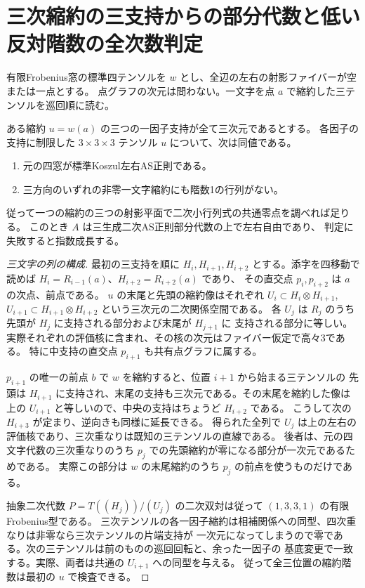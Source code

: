 \section{三次縮約の三支持からの部分代数と低い反対階数の全次数判定}
\label{sec:ternary-point-subalgebras}
有限Frobenius窓の標準四テンソルを $w$ とし、全辺の左右の射影ファイバーが空または一点とする。
点グラフの次元は問わない。一文字を点 $a$ で縮約した三テンソルを巡回順に読む。
\begin{theorem}\label{thm:ternary-point-subalgebras}
ある縮約 $u=w(a)$ の三つの一因子支持が全て三次元であるとする。
各因子の支持に制限した $3\times3\times3$ テンソル $u$ について、次は同値である。
\begin{enumerate}
\item 元の四窓が標準Koszul左右AS正則である。
\item 三方向のいずれの非零一文字縮約にも階数1の行列がない。
\end{enumerate}
従って一つの縮約の三つの射影平面で二次小行列式の共通零点を調べれば足りる。
このとき $A$ は三生成二次AS正則部分代数の上で左右自由であり、
判定に失敗すると指数成長する。
\end{theorem}
\begin{proof}[三文字の列の構成]
最初の三支持を順に $H_i,H_{i+1},H_{i+2}$ とする。添字を四移動で読めば
$H_i=R_{i-1}(a)$、$H_{i+2}=R_{i+2}(a)$ であり、
その直交点 $p_i,p_{i+2}$ は $a$ の次点、前点である。
$u$ の末尾と先頭の縮約像はそれぞれ $U_i\subset H_i\otimes H_{i+1}$,
$U_{i+1}\subset H_{i+1}\otimes H_{i+2}$ という三次元の二次関係空間である。
各 $U_j$ は $R_j$ のうち先頭が $H_j$ に支持される部分および末尾が $H_{j+1}$ に
支持される部分に等しい。実際それぞれの評価核に含まれ、その核の次元はファイバー仮定で高々3である。
特に中支持の直交点 $p_{i+1}$ も共有点グラフに属する。

$p_{i+1}$ の唯一の前点 $b$ で $w$ を縮約すると、位置 $i+1$ から始まる三テンソルの
先頭は $H_{i+1}$ に支持され、末尾の支持も三次元である。その末尾を縮約した像は上の
$U_{i+1}$ と等しいので、中央の支持はちょうど $H_{i+2}$ である。
こうして次の $H_{i+3}$ が定まり、逆向きも同様に延長できる。
得られた全列で $U_j$ は上の左右の評価核であり、三次重なりは既知の三テンソルの直線である。
後者は、元の四文字代数の三次重なりのうち $p_j$ での先頭縮約が零になる部分が一次元であるためである。
実際この部分は $w$ の末尾縮約のうち $p_j$ の前点を使うものだけである。

抽象二次代数 $P=T((H_j))/(U_j)$ の二次双対は従って $(1,3,3,1)$ の有限Frobenius型である。
三次テンソルの各一因子縮約は相補関係への同型、四次重なりは非零なら三次テンソルの片端支持が
一次元になってしまうので零である。次の三テンソルは前のものの巡回回転と、余った一因子の
基底変更で一致する。実際、両者は共通の $U_{i+1}$ への同型を与える。
従って全三位置の縮約階数は最初の $u$ で検査できる。
\end{proof}

